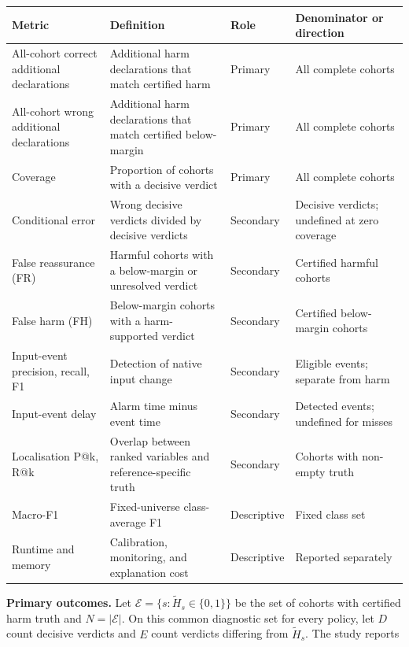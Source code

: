 \documentclass[
]{article}
\begin{document}
\begin{longtable}[]{@{}
  >{\raggedright\arraybackslash}p{}
  >{\raggedright\arraybackslash}p{}
  >{\raggedright\arraybackslash}p{}
  >{\raggedright\arraybackslash}p{}@{}}
\toprule
Metric & Definition & Role & Denominator or direction \\
\midrule
\endhead
All-cohort correct additional declarations & Additional harm
declarations that match certified harm & Primary & All complete
cohorts \\
All-cohort wrong additional declarations & Additional harm declarations
that match certified below-margin & Primary & All complete cohorts \\
Coverage & Proportion of cohorts with a decisive verdict & Primary & All
complete cohorts \\
Conditional error & Wrong decisive verdicts divided by decisive verdicts
& Secondary & Decisive verdicts; undefined at zero coverage \\
False reassurance (FR) & Harmful cohorts with a below-margin or
unresolved verdict & Secondary & Certified harmful cohorts \\
False harm (FH) & Below-margin cohorts with a harm-supported verdict &
Secondary & Certified below-margin cohorts \\
Input-event precision, recall, F1 & Detection of native input change &
Secondary & Eligible events; separate from harm \\
Input-event delay & Alarm time minus event time & Secondary & Detected
events; undefined for misses \\
Localisation P@k, R@k & Overlap between ranked variables and
reference-specific truth & Secondary & Cohorts with non-empty truth \\
Macro-F1 & Fixed-universe class-average F1 & Descriptive & Fixed class
set \\
Runtime and memory & Calibration, monitoring, and explanation cost &
Descriptive & Reported separately \\
\bottomrule
\end{longtable}

\textbf{Primary outcomes.} Let
\(\mathcal{E}=\{s:\widetilde H_s\in\{0,1\}\}\) be the set of cohorts
with certified harm truth and \(N=|\mathcal{E}|\). On this common
diagnostic set for every policy, let \(D\) count decisive verdicts and
\(E\) count verdicts differing from \(\widetilde H_s\). The study
reports
\end{document}

